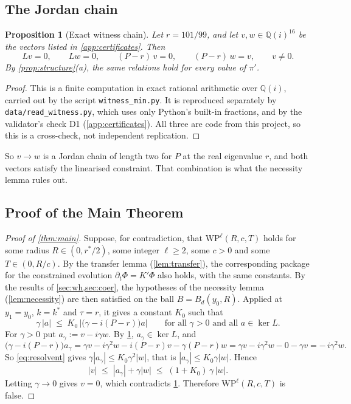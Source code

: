 \documentclass[11pt]{article}
\theoremstyle{plain}
\newtheorem{proposition}[theorem]{Proposition}
\theoremstyle{definition}
\theoremstyle{remark}
\newcommand{\Q}{\mathbb{Q}}
\newcommand{\WP}{\mathrm{WP}}
\begin{document}
\subsection{The Jordan chain}\label{sec:chain}

\begin{proposition}[Exact witness chain]\label{prop:chain}
Let $r = 101/99$, and let $v, w \in \Q(i)^{16}$ be the vectors listed in \cref{app:certificates}. Then
\[
  Lv = 0,\qquad Lw = 0,\qquad (P - r)\,v = 0,\qquad (P - r)\,w = v,\qquad v \neq 0 .
\]
By \cref{prop:structure}(a), the same relations hold for every value of $\pi'$.
\end{proposition}

\begin{proof}
This is a finite computation in exact rational arithmetic over $\Q(i)$, carried out by the script \texttt{witness\_min.py}. It is reproduced separately by \texttt{data/read\_witness.py}, which uses only Python's built-in fractions, and by the validator's check D1 (\cref{app:certificates}). All three are code from this project, so this is a cross-check, not independent replication.
\end{proof}

So $v \to w$ is a Jordan chain of length two for $P$ at the real eigenvalue $r$, and both vectors satisfy the linearised constraint. That combination is what the necessity lemma rules out.

\subsection{Proof of the Main Theorem}\label{sec:proof}

\begin{proof}[Proof of \cref{thm:main}]
Suppose, for contradiction, that $\WP^\ell(R,c,T)$ holds for some radius $R \in (0,r^*/2)$, some integer $\ell \ge 2$, some $c > 0$ and some $T \in (0,R/c)$. By the transfer lemma (\cref{lem:transfer}), the corresponding package for the constrained evolution $\partial_t\Phi = K'\Phi$ also holds, with the same constants. By the results of \cref{sec:wh,sec:coer}, the hypotheses of the necessity lemma (\cref{lem:necessity}) are then satisfied on the ball
$B = B_d(y_0,R)$. Applied at $y_1 = y_0$, $k = k^*$ and $\tau = r$, it gives a constant $K_0$ such that
\begin{equation}\label{eq:resolvent}
  \gamma\,|a| \;\le\; K_0\,\bigl|\bigl(\gamma - i(P - r)\bigr)a\bigr|
  \qquad\text{for all } \gamma > 0 \text{ and all } a \in \ker L .
\end{equation}
For $\gamma > 0$ put $a_\gamma := v - i\gamma w$. By \cref{prop:chain}, $a_\gamma \in \ker L$, and
\[
  \bigl(\gamma - i(P - r)\bigr)a_\gamma
  = \gamma v - i\gamma^2 w - i(P-r)v - \gamma(P-r)w
  = \gamma v - i\gamma^2 w - 0 - \gamma v
  = -\,i\gamma^2 w .
\]
So \eqref{eq:resolvent} gives $\gamma|a_\gamma| \le K_0\gamma^2|w|$, that is $|a_\gamma| \le K_0\gamma|w|$. Hence
\[
  |v| \;\le\; |a_\gamma| + \gamma|w| \;\le\; (1 + K_0)\,\gamma\,|w| .
\]
Letting $\gamma \to 0$ gives $v = 0$, which contradicts \cref{prop:chain}. Therefore $\WP^\ell(R,c,T)$ is false.
\end{proof}
\end{document}
